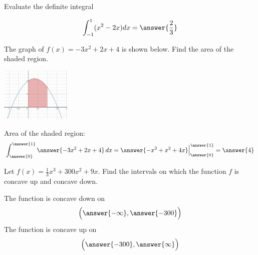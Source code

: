 \documentclass{ximera}
\begin{document}
\begin{problem}\label{prob:mth240finalprob7}
Evaluate the definite integral 
  
$$\int_{-1}^{1} (x^2-2x)dx=\answer{\frac{2}{3}}$$
\end{problem}

\begin{problem}\label{prob:mth240finalprob8}
The graph of $f(x)=-3x^2+2x+4$ is shown below.  Find the area of the shaded region.
\begin{image}
   
\includegraphics[height=1in]{240finalimage3.jpg}

\end{image}
Area of the shaded region:
$$\int_{\answer{0}}^{\answer{1}}\answer{-3x^2+2x+4}\,dx=\answer{-x^3+x^2+4x}\Big|_{\answer{0}}^{\answer{1}}=\answer{4}$$
\end{problem}

\begin{problem}\label{prob:mth240finalprob9}
Let $f(x)=\frac{1}{3}x^3+300x^2+9x$.  Find the intervals on which the function $f$ is concave up and concave down.

The function is concave down on 
$$\Big( \answer{-\infty}, \answer{-300}\Big)$$
The function is concave up on
$$\Big( \answer{-300}, \answer{\infty}\Big)$$

\end{problem}
\end{document}
